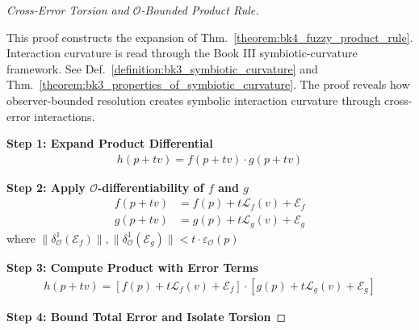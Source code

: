 \begin{proof}[Cross-Error Torsion and $\mathcal{O}$-Bounded Product Rule]
\label{proof:bk4_sketch_cross_field_product}
\leavevmode

This proof constructs the expansion of
Thm.~\ref{theorem:bk4_fuzzy_product_rule}.
Interaction curvature is read through the Book III
symbiotic-curvature framework.
See Def.~\ref{definition:bk3_symbiotic_curvature} and
Thm.~\ref{theorem:bk3_properties_of_symbiotic_curvature}.
The proof reveals how observer-bounded resolution creates symbolic interaction
curvature through cross-error interactions.

\textbf{Step 1: Expand Product Differential}
\begin{align}
h(p + tv) = f(p + tv) \cdot g(p + tv)
\end{align}

\textbf{Step 2: Apply $\mathcal{O}$-differentiability of $f$ and $g$}
\begin{align}
f(p + tv) &= f(p) + t\mathcal{L}_f(v) + \mathcal{E}_f \\
g(p + tv) &= g(p) + t\mathcal{L}_g(v) + \mathcal{E}_g
\end{align}
where $\|\delta^1_{\mathcal{O}}(\mathcal{E}_f)\|, \|\delta^1_{\mathcal{O}}(\mathcal{E}_g)\| < t \cdot \varepsilon_{\mathcal{O}}(p)$

\textbf{Step 3: Compute Product with Error Terms}
\begin{align}
h(p + tv) = [f(p) + t\mathcal{L}_f(v) + \mathcal{E}_f] \cdot [g(p) + t\mathcal{L}_g(v) + \mathcal{E}_g]
\end{align}

\textbf{Step 4: Bound Total Error and Isolate Torsion}


\end{proof}
